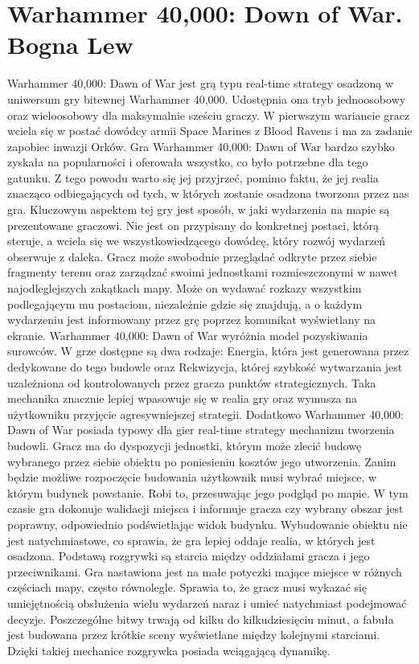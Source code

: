 \section{Warhammer 40,000: Down of War. Bogna Lew}

Warhammer 40,000: Dawn of War jest grą typu real-time strategy osadzoną w uniwersum gry bitewnej Warhammer 40,000. Udostępnia
ona tryb jednoosobowy oraz wieloosobowy dla maksymalnie sześciu graczy. W pierwszym wariancie gracz wciela się w postać dowódcy
armii Space Marines z Blood Ravens i ma za zadanie zapobiec inwazji Orków. Gra Warhammer 40,000: Dawn of War bardzo szybko
zyskała na popularności i oferowała wszystko, co było potrzebne dla tego gatunku. Z tego powodu warto się jej przyjrzeć,
pomimo faktu, że jej realia znacząco odbiegających od tych, w których zostanie osadzona tworzona przez nas gra.
Kluczowym aspektem tej gry jest sposób, w jaki wydarzenia na mapie są prezentowane graczowi. Nie jest on przypisany do
konkretnej postaci, którą steruje, a wciela się we wszystkowiedzącego dowódcę, który rozwój wydarzeń obserwuje z daleka.
Gracz może swobodnie przeglądać odkryte przez siebie fragmenty terenu oraz zarządzać swoimi jednostkami rozmieszczonymi
w nawet najodleglejszych zakątkach mapy. Może on wydawać rozkazy wszystkim podlegającym mu postaciom, niezależnie gdzie
się znajdują, a o każdym wydarzeniu jest informowany przez grę poprzez komunikat wyświetlany na ekranie.
Warhammer 40,000: Dawn of War wyróżnia model pozyskiwania surowców. W grze dostępne są dwa rodzaje: Energia, która jest
generowana przez dedykowane do tego budowle oraz Rekwizycja, której szybkość wytwarzania jest uzależniona od kontrolowanych
przez gracza punktów strategicznych. Taka mechanika znacznie lepiej wpasowuje się w realia gry oraz wymusza na użytkowniku
przyjęcie agresywniejszej strategii.
Dodatkowo Warhammer 40,000: Dawn of War posiada typowy dla gier real-time strategy mechanizm tworzenia budowli. Gracz ma
do dyspozycji jednostki, którym może zlecić budowę wybranego przez siebie obiektu po poniesieniu kosztów jego utworzenia.
Zanim będzie możliwe rozpoczęcie budowania użytkownik musi wybrać miejsce, w którym budynek powstanie. Robi to, przesuwając
jego podgląd po mapie. W tym czasie gra dokonuje walidacji miejsca i informuje gracza czy wybrany obszar jest poprawny,
odpowiednio podświetlając widok budynku. Wybudowanie obiektu nie jest natychmiastowe, co sprawia, że gra lepiej oddaje
realia, w których jest osadzona.
Podstawą rozgrywki są starcia między oddziałami gracza i jego przeciwnikami. Gra nastawiona jest na małe potyczki mające
miejsce w różnych częściach mapy, często równolegle. Sprawia to, że gracz musi wykazać się umiejętnością obsłużenia wielu
wydarzeń naraz i umieć natychmiast podejmować decyzje. Poszczególne bitwy trwają od kilku do kilkudziesięciu minut, a
fabuła jest budowana przez krótkie sceny wyświetlane między kolejnymi starciami. Dzięki takiej mechanice rozgrywka
posiada wciągającą dynamikę.
